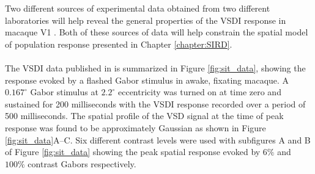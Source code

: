 \documentclass[phd,ianc,twoside]{infthesis}
\begin{document}
Two different sources of experimental data obtained from two different
laboratories will help reveal the general properties of the VSDI
response in macaque V1 \citep{sit_neuron09,reynaud_jn12}. Both of these
sources of data will help constrain the spatial model of population
response presented in Chapter \ref{chapter:SIRD}.

\paragraph*{\citet{sit_neuron09}}


The VSDI data published in \citet{sit_neuron09} is summarized in Figure
\ref{fig:sit_data}, showing the response evoked by a flashed Gabor
stimulus in awake, fixating macaque. A $0.167^\circ$ Gabor stimulus at
$2.2^\circ$ eccentricity was turned on at time zero and sustained for 200
milliseconds with the VSDI response recorded over a period of 500
milliseconds. The spatial profile of the VSD signal at the time of peak
response was found to be approximately Gaussian as shown in Figure
\ref{fig:sit_data}A--C. Six different contrast levels were used with
subfigures A and B of Figure \ref{fig:sit_data} showing the peak spatial
response evoked by $6\%$ and $100\%$ contrast Gabors respectively.
\end{document}
